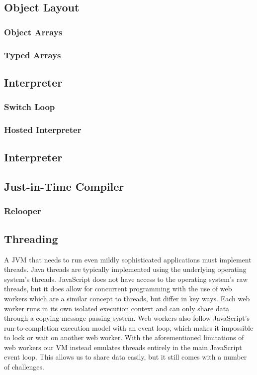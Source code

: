 \documentclass{acm_proc_article-sp}
\begin{document}
\subsection{Object Layout} \label{sec:objectLayout}

\subsubsection{Object Arrays}

\subsubsection{Typed Arrays}

\subsection{Interpreter}

\subsubsection{Switch Loop}

\subsubsection{Hosted Interpreter}

\subsection{Interpreter}

\subsection{Just-in-Time Compiler}

\subsubsection{Relooper}

\subsection{Threading}

A JVM that needs to run even mildly sophisticated applications must implement threads.
Java threads are typically implemented using the underlying operating system's threads.
JavaScript does not have access to the operating system's raw threads, but it does allow for concurrent programming with the use of web workers which are a similar concept to threads, but differ in key ways.
Each web worker runs in its own isolated execution context and can only share data through a copying message passing system.
Web workers also follow JavaScript's run-to-completion execution model with an event loop, which makes it impossible to lock or wait on another web worker.
With the aforementioned limitations of web workers our VM instead emulates threads entirely in the main JavaScript event loop.
This allows us to share data easily, but it still comes with a number of challenges.
\end{document}
